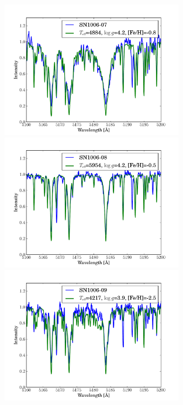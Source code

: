 \begin{figure}[htbp]
   \label{fig:sn1006_candfit}
\end{figure}\begin{figure}[htbp] %
   \centering
\includegraphics[width=0.7\textwidth, trim=0 0mm 0 10mm, clip]{chapter_sn1006/plots/gold_spectra/sn1006_07.pdf}
\includegraphics[width=0.7\textwidth, trim=0 0mm 0 10mm, clip]{chapter_sn1006/plots/gold_spectra/sn1006_08.pdf}
\includegraphics[width=0.7\textwidth, trim=0 0mm 0 10mm, clip]{chapter_sn1006/plots/gold_spectra/sn1006_09.pdf}


\end{figure}
